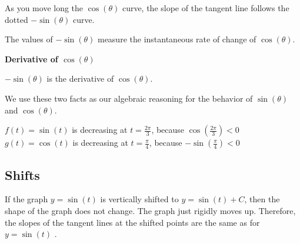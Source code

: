 \documentclass{ximera}
\begin{document}
As you move long the $\cos(\theta)$ curve, the slope of the tangent line follows the dotted $-\sin(\theta)$ curve.



\begin{center}
\end{center}



The values of $-\sin(\theta)$ measure the instantaneous rate of change of $\cos(\theta)$.



\begin{theorem}  \textbf{\textcolor{green!50!black}{Derivative of $\cos(\theta)$}}

\begin{center}
$-\sin(\theta)$ is the derivative of $\cos(\theta)$. 
\end{center}

\end{theorem}







We use these two facts as our algebraic reasoning for the behavior of $\sin(\theta)$ and $\cos(\theta)$.




\begin{example}



$f(t) = \sin(t)$ is decreasing at $t=\frac{2\pi}{3}$, because $\cos\left( \frac{2\pi}{3} \right) < 0$ \\


$g(t) = \cos(t)$ is decreasing at $t=\frac{\pi}{4}$, because $-\sin\left( \frac{\pi}{4} \right) < 0$

\end{example}

















\subsection{Shifts}




If the graph $y = \sin(t)$ is vertically shifted to $y = \sin(t)+C$, then the shape of the graph does not change. The graph just rigidly moves up. Therefore, the slopes of the tangent lines at the shifted points are the same as for $y = \sin(t)$ .
\end{document}
